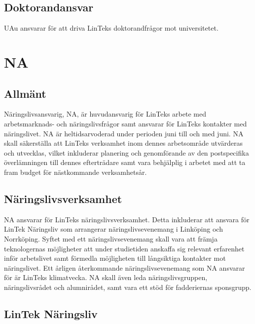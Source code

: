 \hypertarget{doktorandansvar-1}{%
\subsection{Doktorandansvar}\label{doktorandansvar-1}}

UAu ansvarar för att driva LinTeks doktorandfrågor mot universitetet.

\hypertarget{na}{%
\section{NA}\label{na}}

\hypertarget{allmuxe4nt-4}{%
\subsection{Allmänt}\label{allmuxe4nt-4}}

Näringslivsansvarig, NA, är huvudansvarig för LinTeks arbete med
arbetsmarknads- och näringslivsfrågor samt ansvarar för LinTeks
kontakter med näringslivet. NA är heltidsarvoderad under perioden juni
till och med juni. NA skall säkerställa att LinTeks verksamhet inom
dennes arbetsområde utvärderas och utvecklas, vilket inkluderar
planering och genomförande av den postspecifika överlämningen till
dennes efterträdare samt vara behjälplig i arbetet med att ta fram
budget för nästkommande verksamhetsår.

\hypertarget{nuxe4ringslivsverksamhet}{%
\subsection{Näringslivsverksamhet}\label{nuxe4ringslivsverksamhet}}

NA ansvarar för LinTeks näringslivsverksamhet. Detta inkluderar att
ansvara för LinTek Näringsliv som arrangerar näringslivsevenemang i
Linköping och Norrköping. Syftet med ett näringslivsevenemang skall vara
att främja teknologernas möjligheter att under studietiden anskaffa sig
relevant erfarenhet inför arbetslivet samt förmedla möjligheten till
långsiktiga kontakter mot näringslivet. Ett årligen återkommande
näringslivsevenemang som NA ansvarar för är LinTeks klimatvecka. NA
skall även leda näringslivsgruppen, näringslivsrådet och alumnirådet,
samt vara ett stöd för fadderiernas sponsgrupp.

\hypertarget{lintek-nuxe4ringsliv}{%
\subsection{LinTek Näringsliv}\label{lintek-nuxe4ringsliv}}

